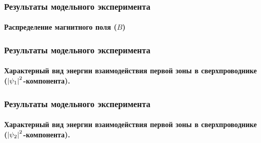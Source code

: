 \begin{frame}
    \frametitle{Результаты модельного эксперимента}
    \framesubtitle{Распределение магнитного поля (\( B \))}
    \begin{figure}[h]
        \begin{minipage}[h]{0.49\linewidth}
            \center{\texttt{[image: 3d\_B]}}
        \end{minipage}
        \hfill
        \begin{minipage}[h]{0.49\linewidth}
        \end{minipage}
    \end{figure}
\end{frame}

\begin{frame}
    \frametitle{Результаты модельного эксперимента}
    \framesubtitle{Характерный вид энергии взаимодействия первой зоны в 
        сверхпроводнике (\( \left| \psi_1 \right|^2 \)-компонента).}
    \begin{figure}[h]
        \begin{minipage}[h]{0.49\linewidth}
            \center{\texttt{[image: 3d\_F1]}}
        \end{minipage}
        \hfill
        \begin{minipage}[h]{0.49\linewidth}
        \end{minipage}
    \end{figure}
\end{frame}

\begin{frame}
    \frametitle{Результаты модельного эксперимента}
    \framesubtitle{Характерный вид энергии взаимодействия первой зоны в 
        сверхпроводнике (\( \left| \psi_2 \right|^2 \)-компонента).}
    \begin{figure}[h]
        \begin{minipage}[h]{0.49\linewidth}
            \center{\texttt{[image: 3d\_F2]}}
        \end{minipage}
        \hfill
        \begin{minipage}[h]{0.49\linewidth}
        \end{minipage}
    \end{figure}
\end{frame}